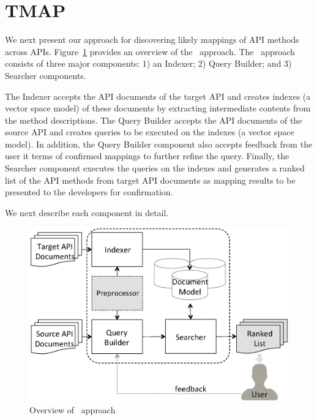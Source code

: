 \section{TMAP}
\label{sec:approach}

We next present our approach for discovering 
likely mappings of API methods  across APIs. 
Figure~\ref{fig:approachOverview} provides an overview of the \tool\ approach.
The \tool\ approach consists of three major components: 1) an Indexer; 2) Query Builder; and 3) Searcher components.


The Indexer accepts the API documents of the target API
and creates indexes (a vector space model) of these documents 
by extracting intermediate contents from the method descriptions. 
The Query Builder accepts the API documents of the source API
and creates queries to be executed on the indexes (a vector space model).
In addition, the Query Builder component also accepts feedback from the
user it terms of confirmed mappings to further refine the query. 
Finally, the Searcher component executes the queries on the indexes and 
generates a ranked list of the API methods from target API documents as
mapping results to be presented to the developers for confirmation.

We next describe each component in detail.


\begin{figure}
	\begin{center}
		\includegraphics[scale=0.45]{ApproahOverview.eps}
		\caption{\label{fig:approachOverview} Overview of \tool\ approach}
	\end{center}
\end{figure}


